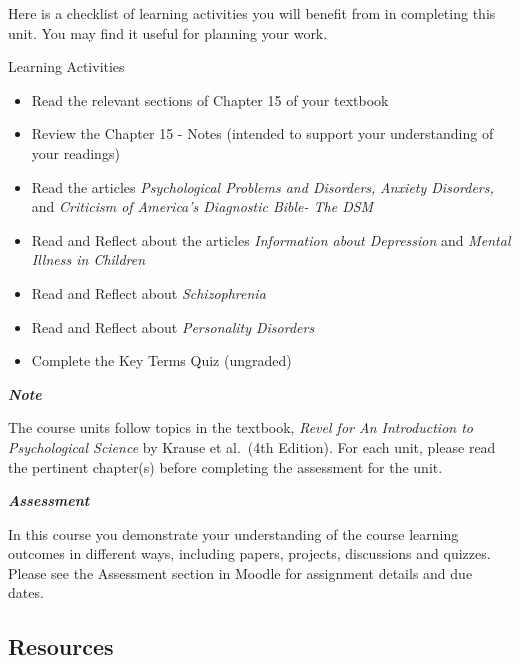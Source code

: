 \documentclass[
]{book}
\providecommand{\tightlist}{%
  \setlength{\itemsep}{0pt}\setlength{\parskip}{0pt}}
\begin{document}
Here is a checklist of learning activities you will benefit from in completing this unit. You may find it useful for planning your work.

\begin{reflect}
{Learning Activities}

\begin{itemize}
\tightlist
\item
  Read the relevant sections of Chapter 15 of your textbook
\item
  Review the Chapter 15 - Notes (intended to support your understanding of your readings)
\item
  Read the articles \emph{Psychological Problems and Disorders,} \emph{Anxiety Disorders,} and \emph{Criticism of America's Diagnostic Bible- The DSM}
\item
  Read and Reflect about the articles \emph{Information about Depression} and \emph{Mental Illness in Children}
\item
  Read and Reflect about \emph{Schizophrenia}
\item
  Read and Reflect about \emph{Personality Disorders}
\item
  Complete the Key Terms Quiz (ungraded)
\end{itemize}
\end{reflect}

\begin{caution}
\textbf{\emph{Note}}

The course units follow topics in the textbook, \emph{Revel for An Introduction to Psychological Science} by Krause et al.~(4th Edition). For each unit, please read the pertinent chapter(s) before completing the assessment for the unit.
\end{caution}

\begin{assessment}
\textbf{\emph{Assessment}}

In this course you demonstrate your understanding of the course learning outcomes in different ways, including papers, projects, discussions and quizzes. Please see the Assessment section in Moodle for assignment details and due dates.
\end{assessment}

\hypertarget{resources-9}{%
\subsection*{Resources}\label{resources-9}}
\end{document}
